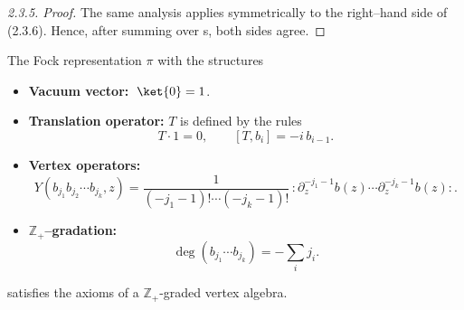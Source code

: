 \documentclass[12pt]{article}
\begin{document}
\begin{proof}[2.3.5. Proof]
    The same analysis applies symmetrically to the right–hand side of (2.3.6). Hence, after summing over s, both sides agree.
\end{proof}





\begin{theorem}[2.3.7]
    The Fock representation $\pi$ with the structures
    \begin{itemize}
        \item \textbf{Vacuum vector:} $\;\ket{0}=1$.
        \item \textbf{Translation operator:} $T$ is defined by the rules
              \[
                  T\cdot 1 = 0, \qquad [T,b_i] = -i\,b_{i-1}.
              \]
        \item \textbf{Vertex operators:}
              \[
                  Y(b_{j_1}b_{j_2}\cdots b_{j_k},z)
                  = \frac{1}{(-j_1-1)!\cdots(-j_k-1)!}\,
                  :\partial_z^{-j_1-1}b(z)\cdots \partial_z^{-j_k-1}b(z):.
              \]
        \item \textbf{$\mathbb{Z}_+$–gradation:}
              \[
                  \deg(b_{j_1}\cdots b_{j_k}) = -\sum_i j_i.
              \]
    \end{itemize}
    satisfies the axioms of a $\mathbb{Z}_+$-graded vertex algebra.
\end{theorem}
\end{document}

